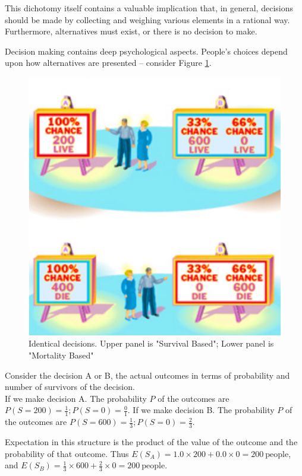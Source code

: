 This dichotomy itself contains a valuable implication that, in general, decisions should be made by collecting and weighing various elements in a rational way. 
Furthermore, alternatives must exist, or there is no decision to make.   

Decision making contains deep psychological aspects. People's choices depend upon how alternatives are
presented -- consider Figure \ref{fig:Picture1.png}.
\begin{figure}[h!] %
   \centering
   \includegraphics[width=6in]{./Lesson1/Picture1.png} 
   \caption{Identical decisions.  Upper panel is "Survival Based"; Lower panel is "Mortality Based" }
   \label{fig:Picture1.png}
\end{figure}
\newline
Consider the decision A or B,  the actual outcomes in terms of probability and number of survivors of the decision.\\
If we make decision A. The probability $P$ of the outcomes are $P(S=200) = \frac{1}{1}; P(S=0) = \frac{0}{1}$.
If we make decision B. The probability $P$ of the outcomes are  $P(S=600) = \frac{1}{3}; P(S=0) = \frac{2}{3}$.

Expectation in this structure is the product of the value of the outcome and the probability of that outcome.
Thus $E(S_A) = 1.0 \times 200 + 0.0 \times 0 = 200~\text{people}$, and  $E(S_B) = \frac{1}{3} \times 600 + \frac{2}{3} \times 0 =  200~\text{people}$.

